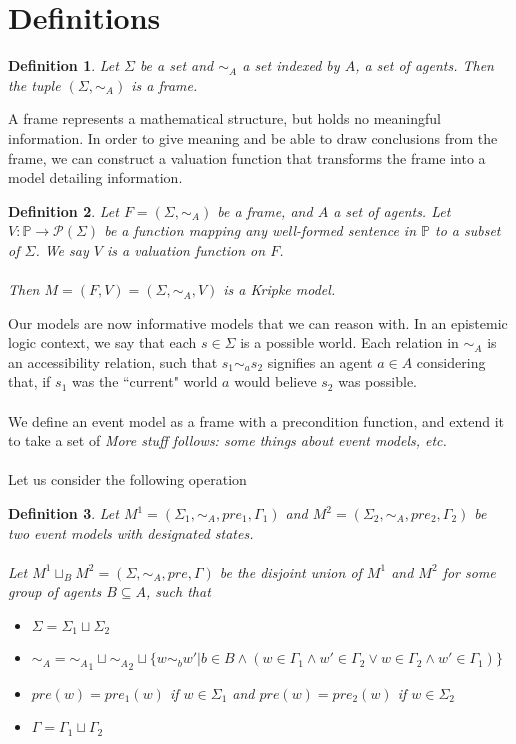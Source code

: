 \documentclass[12pt, a4paper, titlepage]{scrartcl}
\newcommand{\aRel}[1] {
  \sim_{#1} 
}
\newcommand{\kripkeFrame}[2] {
  (#1, \aRel{#2})
}
\newcommand{\kripkeModel}[3] {
  (#1, \aRel{#2}, #3)
}
\newcommand{\frKripModel}[2] { %
  (#1, #2)
}
\newcommand{\actModelStates}[4] {
	(#1, \aRel{#2}, #3, #4)
}
\newtheorem{defn}{Definition}
\begin{document}
\section{Definitions}

\begin{defn} \label{frame}
	Let $\Sigma$ be a set and $\aRel{A}$ a set indexed by $A$, a set of agents.
	Then the tuple $\kripkeFrame{\Sigma}{A}$ is a frame.
\end{defn}

A frame represents a mathematical structure, but holds no meaningful information.
In order to give meaning and be able to draw conclusions from the frame, we can
construct a valuation function that transforms the frame into a model detailing
information.
\begin{defn} \label{model}
	Let $F = \kripkeFrame{\Sigma}{A}$ be a frame, and $A$ a set of agents.
	Let $V: \mathbb{P} \to \mathcal{P}(\Sigma)$ be a function mapping any
	well-formed	sentence in $\mathbb{P}$ to a subset of $\Sigma$.
	We say $V$ is a valuation function on $F$.\\
	\\
	Then $M = \frKripModel{F}{V} = \kripkeModel{\Sigma}{A}{V}$ is a Kripke
	model.
\end{defn}

Our models are now informative models that we can reason with.
In an epistemic logic context, we say that each $s \in \Sigma$ is a possible
world.
Each relation in $\aRel{A}$ is an accessibility relation, such that $s_1 \sim_a
s_2$ signifies an agent $a \in A$ considering that, if $s_1$ was the ``current"
world $a$ would believe $s_2$ was possible.\\
\\
We define an event model as a frame with a precondition function, and extend it
to take a set of 
{\em More stuff follows: some things about event models, etc.}\\
\\
Let us consider the following operation

\begin{defn} \label{gen_union_1}
	Let $M^1 = \actModelStates{\Sigma_1}{A}{pre_1}{\Gamma_1}$ and $M^2 =
	\actModelStates{\Sigma_2}{A}{pre_2}{\Gamma_2}$ be two event models with
	designated states.\\
	\\
	Let $M^1 \sqcup_B M^2 = \actModelStates{\Sigma}{A}{pre}{\Gamma}$ be the disjoint
	union of $M^1$ and $M^2$ for some group	of agents $B \subseteq A$, such that
	\begin{itemize}
		\item $\Sigma = \Sigma_1 \sqcup \Sigma_2$
		\item $\aRel{A} = {\aRel{A}}_1 \sqcup {\aRel{A}}_2 \sqcup \{w \sim_b w' | b \in
		B \land (w \in \Gamma_1 \land w' \in \Gamma_2 \lor w \in \Gamma_2 \land w' \in \Gamma_1)\}$
		\item $pre(w) = pre_1(w)$ if $w \in \Sigma_1$ and $pre(w) = pre_2(w)$ if $w
		\in \Sigma_2$
		\item $\Gamma = \Gamma_1 \sqcup \Gamma_2$
	\end{itemize}
\end{defn}
\end{document}
